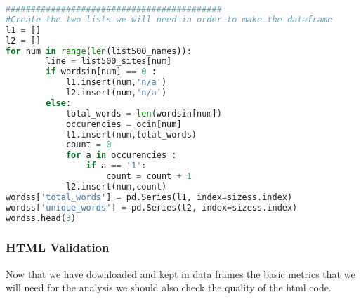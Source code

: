 \documentclass{article}
\begin{document}
\begin{lstlisting}[language=Python]
###########################################
#Create the two lists we will need in order to make the dataframe
l1 = []
l2 = []
for num in range(len(list500_names)):
        line = list500_sites[num] 
        if wordsin[num] == 0 :             
            l1.insert(num,'n/a')
            l2.insert(num,'n/a')
        else:
            total_words = len(wordsin[num])
            occurencies = ocin[num] 
            l1.insert(num,total_words)
            count = 0 
            for a in occurencies :
                if a == '1':
                    count = count + 1
            l2.insert(num,count)
wordss['total_words'] = pd.Series(l1, index=sizess.index)
wordss['unique_words'] = pd.Series(l2, index=sizess.index)          
wordss.head(3)                        
\end{lstlisting}
\subsubsection{HTML Validation}
Now that we have downloaded and kept in data frames the basic metrics that we will need for the analysis we should also check the quality of the html code.
\end{document}

